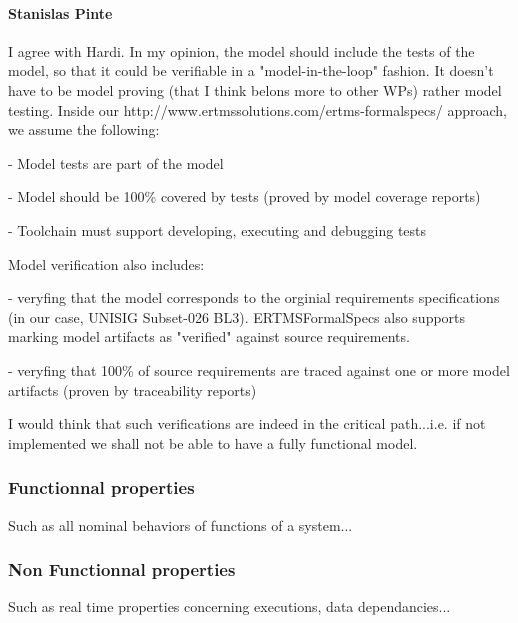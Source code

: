 \documentclass[11pt, a4paper]{article}
\begin{document}
\paragraph{Stanislas Pinte}
I agree with Hardi. 
In my opinion, the model should include the tests of the model, so that it could be verifiable in a "model-in-the-loop" fashion.
It doesn't have to be model proving (that I think belons more to other WPs) rather model testing.
Inside our http://www.ertmssolutions.com/ertms-formalspecs/ approach, we assume the following:

- Model tests are part of the model

- Model should be 100\% covered by tests (proved by model coverage reports)

- Toolchain must support developing, executing and debugging tests

Model verification also includes:

- veryfing that the model corresponds to the orginial requirements specifications (in our case, UNISIG Subset-026 BL3). ERTMSFormalSpecs also supports marking model artifacts as "verified" against source requirements.

- veryfing that 100\% of source requirements are traced against one or more model artifacts (proven by traceability reports)

I would think that such verifications are indeed in the critical path...i.e. if not implemented we shall not be able to have a fully functional model.

\subsubsection{Functionnal properties}

Such as all nominal behaviors of functions of a system...


\subsubsection{Non Functionnal properties}

Such as real time properties concerning executions, data dependancies...


\end{document}
